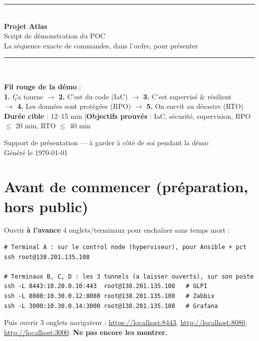 \documentclass[11pt,a4paper]{article}
\begin{document}
\begin{titlepage}
\centering
\vspace*{2cm}
{\color{atlasblue}\rule{\linewidth}{2pt}}\\[0.6cm]
{\Huge\bfseries\color{atlasdark} Projet Atlas}\\[0.3cm]
{\LARGE Script de démonstration du POC}\\[0.2cm]
{\large\color{codecom} La séquence exacte de commandes, dans l'ordre, pour présenter}\\[0.4cm]
{\color{atlasblue}\rule{\linewidth}{2pt}}\\[1.2cm]

\begin{tcolorbox}[width=0.9\linewidth,colback=atlasgray,colframe=atlasdark,sharp corners]
\centering\small
\textbf{Fil rouge de la démo} : \\[3pt]
\textbf{1.} Ça tourne \; $\rightarrow$ \; \textbf{2.} C'est du code (IaC) \; $\rightarrow$ \;
\textbf{3.} C'est supervisé \& résilient \\[2pt]
$\rightarrow$ \; \textbf{4.} Les données sont protégées (RPO) \; $\rightarrow$ \;
\textbf{5.} On survit au désastre (RTO)\\[6pt]
\textbf{Durée cible} : 12–15 min \quad|\quad \textbf{Objectifs prouvés} : IaC, sécurité, supervision, RPO $\leq$ 20 min, RTO $\leq$ 40 min
\end{tcolorbox}

\vfill
{\color{codecom}\small Support de présentation — à garder à côté de soi pendant la démo}\\
{\color{codecom}\small Généré le \today}
\end{titlepage}

\tableofcontents
\newpage

\section*{Avant de commencer (préparation, hors public)}
Ouvrir \textbf{à l'avance} 4 onglets/terminaux pour enchaîner sans temps mort :

\begin{lstlisting}[style=bash]
# Terminal A : sur le control node (hyperviseur), pour Ansible + pct
ssh root@138.201.135.108

# Terminaux B, C, D : les 3 tunnels (a laisser ouverts), sur son poste
ssh -L 8443:10.20.0.10:443  root@138.201.135.108   # GLPI
ssh -L 8080:10.30.0.12:8080 root@138.201.135.108   # Zabbix
ssh -L 3000:10.30.0.14:3000 root@138.201.135.108   # Grafana
\end{lstlisting}
Puis ouvrir 3 onglets navigateur : \url{https://localhost:8443}, \url{http://localhost:8080},
\url{http://localhost:3000}. \textbf{Ne pas encore les montrer.}
\end{document}
